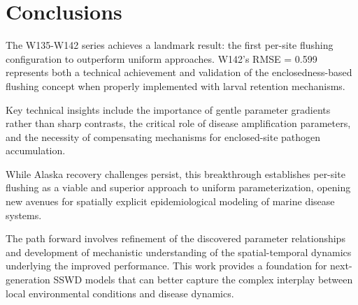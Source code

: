 \documentclass[11pt,letterpaper]{article}
\begin{document}
\section{Conclusions}

The W135-W142 series achieves a landmark result: the first per-site flushing configuration to outperform uniform approaches. W142's RMSE = 0.599 represents both a technical achievement and validation of the enclosedness-based flushing concept when properly implemented with larval retention mechanisms.

Key technical insights include the importance of gentle parameter gradients rather than sharp contrasts, the critical role of disease amplification parameters, and the necessity of compensating mechanisms for enclosed-site pathogen accumulation.

While Alaska recovery challenges persist, this breakthrough establishes per-site flushing as a viable and superior approach to uniform parameterization, opening new avenues for spatially explicit epidemiological modeling of marine disease systems.

The path forward involves refinement of the discovered parameter relationships and development of mechanistic understanding of the spatial-temporal dynamics underlying the improved performance. This work provides a foundation for next-generation SSWD models that can better capture the complex interplay between local environmental conditions and disease dynamics.
\end{document}
